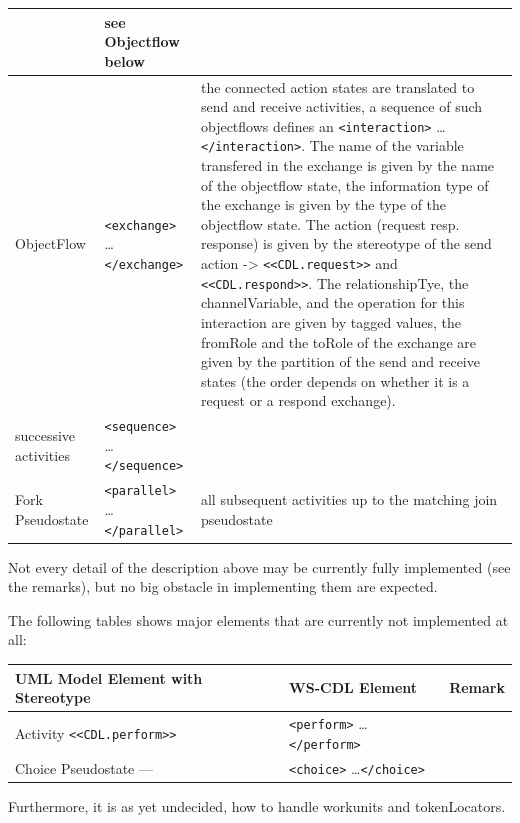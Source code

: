 \documentclass[pdftex]{scrartcl}
\newcommand{\st}[1]{\texttt{<<#1>>}}
\newcommand{\xml}[1]{\texttt{<#1>} \ldots \texttt{</#1>}}
\begin{document}
\begin{longtable}{p{5cm}|p{4.5cm}|p{5.5cm}}
  & see Objectflow below
  \\\hline
  ObjectFlow                               & \xml{exchange} & the
  connected action states are translated to send and receive
  activities, a sequence of such objectflows defines an
  \xml{interaction}. The name of the variable transfered in the
  exchange is given by the name of the objectflow state, the
  information type of the exchange is given by the type of the objectflow
  state. The action (request resp. response) is given by the stereotype of the send
  action -> \texttt{<<CDL.request>>} and \texttt{<<CDL.respond>>}. The
  relationshipTye, the channelVariable, and the operation for this
  interaction are given by tagged values, the fromRole and the toRole
  of the exchange are given by the partition of the send and receive
  states (the order depends on whether it is a request or a respond
  exchange). 
   \\ \hline
  successive activities                    & \xml{sequence} & 
  \\ \hline
  Fork Pseudostate                     & \xml{parallel} & all
  subsequent activities up to the matching join pseudostate \\\hline
\end{longtable}

Not every detail of the description above may be currently fully
implemented (see the remarks), but no big obstacle in implementing
them are expected. 

The following tables shows major elements that are currently not
implemented at all:

\begin{longtable}{p{5cm}|p{4.5cm}|p{5.5cm}}
  \textbf{UML Model Element with Stereotype}& \textbf{WS-CDL Element} & 
  \textbf{Remark} \\\hline\hline
  Activity           \st{CDL.perform}          & \xml{perform}          &
  \\\hline
  Choice Pseudostate  ---                  & \xml{choice} & \\\hline
\end{longtable}

Furthermore, it is as yet undecided, how to handle workunits and
tokenLocators. 
 
\end{document}
